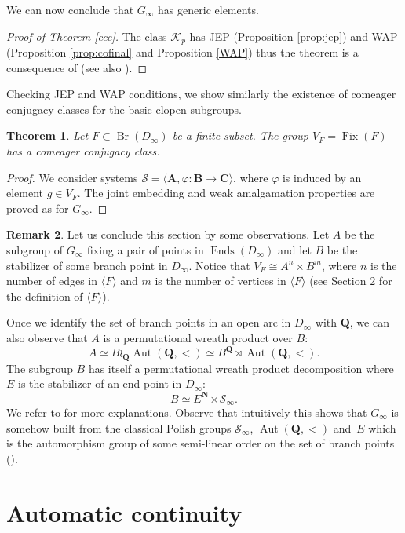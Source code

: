 \documentclass[JEP,XML,SOM,Unicode,NoFloatCountersInSection]{cedram}
\let\mathcal\mathscr
\theoremstyle{plain}
\newtheorem{thm}{Theorem}[section]
\theoremstyle{definition}
\newtheorem{rem}[thm]{Remark}
\newcommand{\bA}{{\boldsymbol{A}}}
\newcommand{\bB}{{\boldsymbol{B}}}
\newcommand{\bC}{{\boldsymbol{C}}}
\newcommand{\NN}{\mathbf{N}}
\newcommand{\QQ}{\mathbf{Q}}
\newcommand{\cK}{\mathcal{K}}
\newcommand{\cS}{\mathcal{S}}
\newcommand{\sinf}{\cS_\infty}
\DeclareMathOperator{\Aut}{Aut}
\DeclareMathOperator{\Ends}{Ends}
\DeclareMathOperator{\Br}{Br}
\DeclareMathOperator{\Fix}{Fix}
\begin{document}
We can now conclude that $G_\infty$ has generic elements.

\begin{proof}[Proof of Theorem \ref{ccc}] The class $\cK_p$ has JEP (Proposition \ref{prop:jep}) and WAP (Proposition \ref{prop:cofinal} and Proposition \ref{WAP}) thus the theorem is a consequence of \cite{MR1162490} (see also \cite[\S3]{Kechris-Rosendal}).\end{proof}

Checking JEP and WAP conditions, we show similarly the existence of comeager conjugacy classes for the basic clopen subgroups.

\begin{thm}\label{cccv} Let $F\subset \Br(D_\infty)$ be a finite subset. The group $V_F=\Fix(F)$ has a comeager conjugacy class.\end{thm}

\begin{proof}We consider systems $\cS=\langle \bA,\varphi\colon\bB\to\bC\rangle$, where $\varphi$ is induced by an element $g\in V_F$. The joint embedding and weak amalgamation properties are proved as for $G_\infty$.
\end{proof}

\begin{rem}Let us conclude this section by some observations. Let $A$ be the subgroup of $ G_\infty$ fixing a pair of points in $\Ends(D_\infty)$ and let $B$ be the stabilizer of some branch point in $D_\infty$. Notice that $V_F\cong A^n\times B^m$, where $n$ is the number of edges in $\langle F\rangle$ and $m$ is the number of vertices in $\langle F\rangle$ (see Section 2 for the definition of $\langle F\rangle$).

Once we identify the set of branch points in an open arc in $D_\infty$ with $\QQ$, we can also observe that $A$ is a permutational wreath product over $B$:
\[
A\simeq B\wr_\QQ\Aut(\QQ,<)\simeq B^\QQ\rtimes \Aut(\QQ,<).
\]
The subgroup $B$ has itself a permutational wreath product decomposition where $E$ is the stabilizer of an end point in $D_\infty$:
\[
B\simeq E^\NN\rtimes \sinf.
\]
We refer to \cite[Lem.\,7.1]{DM_dendritesII} for more explanations. Observe that intuitively this shows that $G_\infty$ is somehow built from the classical Polish groups $\sinf$, $\Aut(\QQ,<)$ and~$E$ which is the automorphism group of some semi-linear order on the set of branch points (\cite[Cor.\,5.21]{DM_dendritesII}).\end{rem}

\section{Automatic continuity}\label{automatic}
\end{document}
